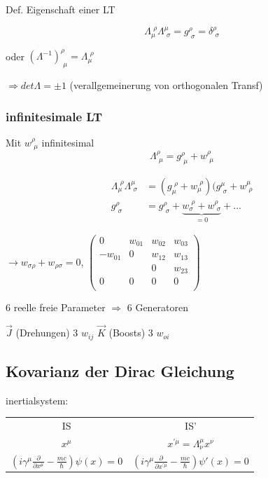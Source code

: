 Def. Eigenschaft einer LT

\[\Lambda_\mu^{\,\, \rho}\Lambda^\mu_{\,\,\sigma} = g^\rho_{\,\,\sigma} = \delta^\rho_{\,\, \sigma}  \]

oder \((\Lambda^{-1})^\rho_{\,\,\mu} = \Lambda_\mu^{\,\,\rho}\)

\(\Rightarrow det\Lambda = \pm 1\) (verallgemeinerung von orthogonalen Transf)

\subsubsection{infinitesimale LT}

Mit \(w^\rho_{\,\,\mu}\) infinitesimal
\[\Lambda^\rho_{\,\,\mu} = g^\rho_{\,\,\mu}+w^\rho_{\,\,\mu} \]

\begin{align}
\Lambda^{\,\,\rho}_{\mu}\Lambda^\mu_{\,\,\sigma}  &= (g_\mu^{\,\,\rho}+w_\mu^{\,\,\rho})(g^\mu_{\,\,\sigma}+w^\mu_{\,\,\rho} \\
g^\rho_{\,\,\sigma} &= g^\rho_{\,\,\sigma}+\underbrace{w_\sigma^{\,\,\rho}+w^\rho_{\,\,\sigma}}_{=0}+...
\end{align}

\(\rightarrow w_{\sigma\rho}+w_{\rho\sigma}=0\), \( \begin{pmatrix}0&w_{01}&w_{02}&w_{03}\\ -w_{01}&0&w_{12}&w_{13}\\ &&0&w_{23}\\ 0&0&0&0\\ \end{pmatrix} \)

6 reelle freie Parameter  \(\Rightarrow \) 6 Generatoren

\(\vec J\) (Drehungen) 3 \(w_{ij}\)
\(\vec K\) (Boosts) 3 \(w_{oi}\)


\subsection{Kovarianz der Dirac Gleichung}

inertialsystem:

\begin{tabular}{cc}
  IS&IS'\\
\(x^\mu\)& \(x^{'\mu}=\Lambda^\mu_\nu x^\nu\)\\
\((i\gamma^\mu\frac{\partial}{\partial x^\mu}-\frac{mc}{\hbar})\psi(x) = 0\)&\((i\gamma^\mu\frac{\partial}{\partial x^{'\mu}}-\frac{mc}{\hbar})\psi'(x) = 0\)
\end{tabular}


